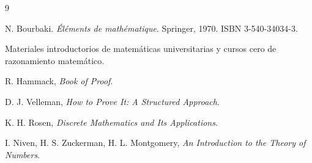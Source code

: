 \documentclass[11pt,a4paper,openany]{book}
\begin{document}
\backmatter

\renewcommand{\bibname}{Bibliografía inicial recomendada}

\begin{thebibliography}{9}

  N. Bourbaki.
  \emph{Éléments de mathématique}.
  Springer, 1970.
  ISBN 3-540-34034-3.

Materiales introductorios de matemáticas universitarias y cursos cero de razonamiento matemático.

R. Hammack, \emph{Book of Proof}.

D. J. Velleman, \emph{How to Prove It: A Structured Approach}.

K. H. Rosen, \emph{Discrete Mathematics and Its Applications}.

I. Niven, H. S. Zuckerman, H. L. Montgomery, \emph{An Introduction to the Theory of Numbers}.

\end{thebibliography}
\end{document}
